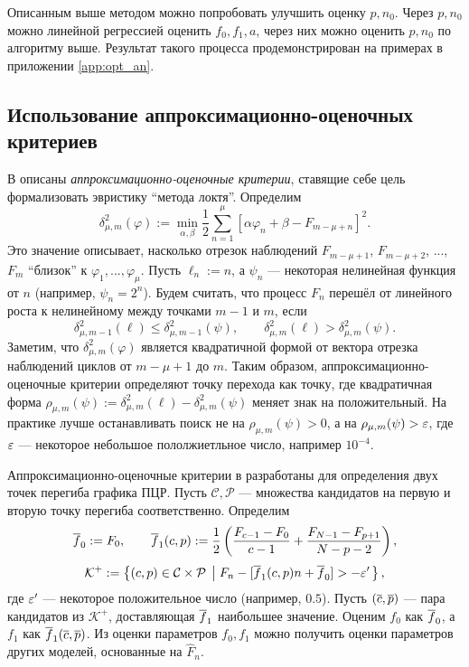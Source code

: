 Описанным выше методом можно попробовать улучшить оценку $p,n_0$. Через $p,n_0$
можно линейной регрессией оценить $f_0,f_1,a$, через них можно оценить $p,n_0$
по алгоритму выше. Результат такого процесса продемонстрирован на примерах в
приложении \ref{app:opt_an}.

\subsection{Использование аппроксимационно-оценочных критериев}\label{ssec:app-est}

В
\cite{orekhovQuasiDeterministicProcessesMonotonic2021,orekhovUnsupervisedMachineLearning2023}
описаны {\it аппроксимационно-оценочные критерии}, ставящие себе цель
формализовать эвристику \enquote{метода локтя}. Определим
\[
  \delta_{\mu,m}^{2}(\varphi) := \min_{\alpha,\beta}\frac{1}{2}
  \sum_{n=1}^{\mu}[\alpha\varphi_{n}+\beta - F_{m-\mu+n}]^{2}.
\]
Это значение описывает, насколько отрезок наблюдений $F_{m-\mu+1}$,
$F_{m-\mu+2}$, ..., $F_{m}$  \enquote{близок} к $\varphi_1,...,\varphi_{\mu}$.
Пусть $\ell_{n}:=n$, а $\psi_{n}$ --- некоторая нелинейная функция от $n$
(например, $\psi_{n}=2^{n}$). Будем считать, что процесс $F_{n}$ перешёл от
линейного роста к нелинейному между точками $m-1$ и $m$, если
\[
  \delta^{2}_{\mu,m-1}(\ell)\leq\delta^{2}_{\mu,m-1}(\psi),\qquad
  \delta^{2}_{\mu,m}(\ell)>\delta^{2}_{\mu,m}(\psi).
\]
Заметим, что $\delta^{2}_{\mu,m}(\varphi)$ является квадратичной формой от
вектора отрезка наблюдений циклов от $m-\mu+1$ до $m$. Таким образом,
аппроксимационно\hyp{}оценочные критерии определяют точку перехода как точку,
где квадратичная форма
$\rho_{\mu,m}(\psi):=\delta^{2}_{\mu,m}(\ell)-\delta^{2}_{\mu,m}(\psi)$
меняет знак на положительный. На практике лучше останавливать поиск не на
$\rho_{\mu,m}(\psi)>0$, а на $\rho_{\mu,m}(\psi)>\varepsilon$, где $\varepsilon$ ---
некоторое небольшое пололжиетльное число, например $10^{-4}$.

Аппроксимационно\hyp{}оценочные критерии в
\cite{orekhovUnsupervisedMachineLearning2023} разработаны для определения двух
точек перегиба графика ПЦР. Пусть $\mathcal C,\mathcal P$ --- множества
кандидатов на первую и вторую точку перегиба соответственно. Определим
\[
  \overline{f}_0:= F_0,\qquad
  \overline{f}_1(c,p):=\frac{1}{2}\left(\frac{F_{c-1}-F_0}{c-1}
  +\frac{F_{N-1}-F_{p+1}}{N-p-2}\right),
\]
\[
  \mathcal K^{+}:=\left\{(c,p)\in\mathcal C\times\mathcal P\;\left|\;
  F_{n}- [\overline{f}_1(c,p)n+\overline{f}_0]>-\varepsilon'\right.
  \right\},
\]
где $\varepsilon'$ --- некоторое положительное число (например, $0.5$). Пусть
$(\overline{c}, \overline{p})$ --- пара кандидатов из $\mathcal K^{+}$, доставляющая
$\overline{f}_1$ наибольшее значение. Оценим $f_0$ как $\overline{f}_0$, а $f_1$ как
$\overline{f}_1(\overline{c},\overline{p})$. Из оценки параметров $f_0,f_1$ можно получить
оценки параметров других моделей, основанные на $\hat F_{n}$.

